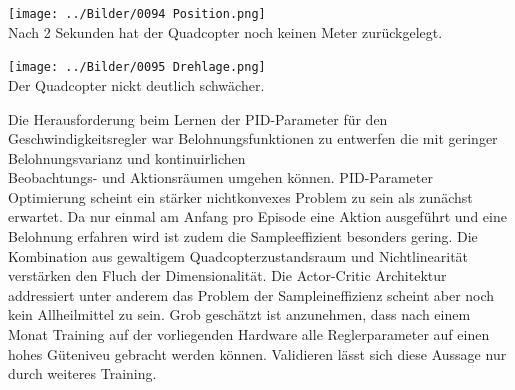 \begin{center}
	\texttt{[image: ../Bilder/0094 Position.png]}{\\Nach 2 Sekunden hat der Quadcopter noch keinen Meter zurückgelegt.}
\end{center}
\begin{center}
	\texttt{[image: ../Bilder/0095 Drehlage.png]}{\\Der Quadcopter nickt deutlich schwächer.}
\end{center}
Die Herausforderung beim Lernen der PID-Parameter für den Geschwindigkeitsregler war Belohnungsfunktionen zu entwerfen die mit geringer Belohnungsvarianz und kontinuirlichen\\ Beobachtungs- und Aktionsräumen umgehen können. PID-Parameter Optimierung scheint ein stärker nichtkonvexes Problem zu sein als zunächst erwartet. Da nur einmal am Anfang pro Episode eine Aktion ausgeführt und eine Belohnung erfahren wird ist zudem die Sampleeffizient besonders gering. Die Kombination aus gewaltigem Quadcopterzustandsraum und Nichtlinearität verstärken den Fluch der Dimensionalität. Die Actor-Critic Architektur addressiert unter anderem das Problem der Sampleineffizienz scheint aber noch kein Allheilmittel zu sein. Grob geschätzt ist anzunehmen, dass nach einem Monat Training auf der vorliegenden Hardware alle Reglerparameter auf einen hohes Güteniveu gebracht werden können. Validieren lässt sich diese Aussage nur durch weiteres Training.

